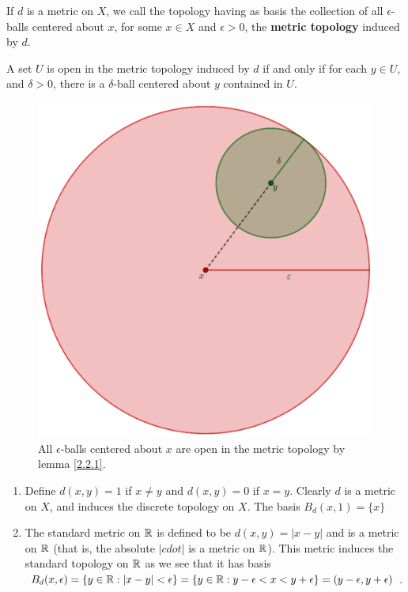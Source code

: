 \begin{definition}
    If $d$ is a metric on  $X$, we call the topology having as basis the collection of all
    $\epsilon$-balls centered about  $x$, for some  $x \in X$ and  $\epsilon>0$, the \textbf {metric
    topology} induced by $d$.		
\end{definition}

\begin{corollary}
    A set $U$ is open in the metric topology induced by  $d$ if and only if for each  $y \in U$, and
     $\delta>0$, there is a  $\delta$-ball centered about $y$ contained in  $U$.
\end{corollary}

\begin{figure}
    \centering
    \includegraphics[scale = 0.2]{Figures/Chapter2/openBall.eps}
    \caption{All $\epsilon$-balls centered about  $x$ are open in the metric topology by lemma
    \ref{2.2.1}.}
    \label{fig2.1}
\end{figure}

\begin{example}
    \begin{enumerate}[label=(\arabic*)]
        \item Define $d(x,y)=1$ if $x \neq y$ and  $d(x,y)=0$ if $x=y$. Clearly  $d$ is a metric on
            $X$, and induces the discrete topology on  $X$. The basis  $B_d(x,1)=\{x\}$

        \item The standard metric on $\mathbb{R}$ is defined to be  $d(x,y)=|x-y|$ and is a metric on $\mathbb{R}$ 
            (that is, the absolute $|cdot|$ is a metric on  $\mathbb{R}$). This metric induces the standard
            topology on $\mathbb{R}$ as we see that it has basis $B_d(x,\epsilon)=\{y \in \mathbb{R}:
            |x-y|<\epsilon\}=\{y \in \mathbb{R}: y-\epsilon<x<y+\epsilon\}=(y-\epsilon,y+\epsilon)$.
    \end{enumerate}		
\end{example} 

